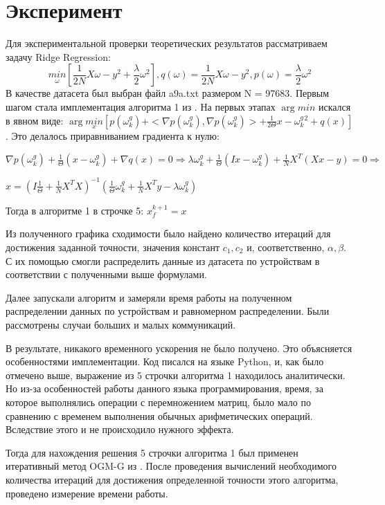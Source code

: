 \documentclass{article}
\begin{document}
\section{Эксперимент}
Для экспериментальной проверки теоретических результатов рассматриваем задачу Ridge Regression: 
\begin{equation}
    \underset{\omega}{min}[ \frac{1}{2N} X\omega - y^2 + \frac{\lambda}{2}\omega^2], q(\omega) = \frac{1}{2N} X\omega - y^2, p(\omega) = \frac{\lambda}{2}\omega^2
\end{equation}
В качестве датасета был выбран файл a9a.txt размером N = 97683. Первым шагом стала имплементация алгоритма 1 из \cite{kovalev2022optimal}. 
На первых этапах $\arg min$ искался в явном виде: $\arg\underset{x}{min} [p(\omega_k^g) + <\nabla p(\omega_k^g), \nabla p(\omega_k^g)> + \frac{1}{2\Theta}x - \omega_k^g^2 + q(x)]$. Это делалось приравниванием градиента к нулю: 
\begin{center}
$\nabla p(\omega_k^g) + \frac{1}{\Theta}(x - \omega_k^g) + \nabla q(x) = 0 \Rightarrow \lambda\omega_k^g + \frac{1}{\Theta}(Ix - \omega_k^g) + \frac{1}{N}X^T(Xx - y) = 0 \Rightarrow$

    
$ x = (I \frac{1}{\Theta} + \frac{1}{N}X^TX)^{-1}(\frac{1}{\Theta} \omega_k^g + \frac{1}{N}X^Ty - \lambda\omega_k^g) $
\end{center}

Тогда в алгоритме 1 в строчке 5: $x_f^{k+1} = x$

Из полученного графика сходимости было найдено количество итераций для достижения заданной точности, значения констант $c_1, c_2$ и, соответственно, $\alpha, \beta$. С их помощью смогли распределить данные из датасета по устройствам в соответствии с полученными выше формулами. 

Далее запускали алгоритм и замеряли время работы на полученном распределении данных по устройствам и равномерном распределении. Были рассмотрены случаи больших и малых коммуникаций. 

В результате, никакого временного ускорения не было получено. Это объясняется особенностями имплементации. Код писался на языке Python, и, как было отмечено выше, выражение из 5 строчки алгоритма 1 находилось аналитически. Но из-за особенностей работы данного языка программирования, время, за которое выполнялись операции с перемножением матриц, было мало по сравнению с временем выполнения обычных арифметических операций. Вследствие этого и не происходило нужного эффекта.

Тогда для нахождения решения 5 строчки алгоритма 1 был применен итеративный метод OGM-G из \cite{kim2021optimizing}. После проведения вычислений необходимого количества итераций для достижения определенной точности этого алгоритма, проведено измерение времени работы.
\end{document}
